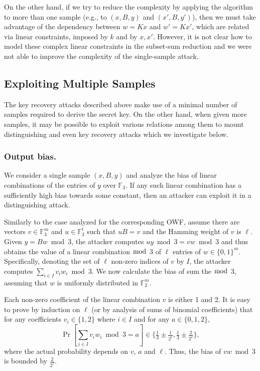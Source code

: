 \documentclass[orivec,envcountsect]{llncs}
\begin{document}
On the other hand, if we try to reduce the complexity by applying the algorithm to more than one sample (e.g., to $(x,B,y)$ and $(x',B,y')$), then we must take advantage of the dependency between $w = K x$ and $w' = K x'$, which are related via linear constraints, imposed by $k$ and by $x,x'$. However, it is not clear how to model these complex linear constraints in the subset-sum reduction and we were not able to improve the complexity of the single-sample attack.

\subsection{Exploiting Multiple Samples}
The key recovery attacks described above make use of a minimal number of samples required to derive the secret key. On the other hand, when given more samples, it may be possible to exploit various relations among them to mount distinguishing and even key recovery attacks which we investigate below.

\subsubsection{Output bias.}
We consider a single sample $(x,B,y)$ and analyze the bias of linear combinations of the entries of $y$ over $\mathbb{F}_3$.
If any such linear combination has a sufficiently high bias towards some constant,
then an attacker can exploit it in a distinguishing attack.

Similarly to the case analyzed for the corresponding OWF, assume there are vectors $v \in \mathbb{F}_3^m$ and $u \in \mathbb{F}_3^t$ such that $u B = v$ and the Hamming weight of $v$ is $\ell$. Given $y = Bw \bmod 3$, the attacker computes $uy \bmod 3 = vw \bmod 3$ and thus obtains the value of a linear combination $\bmod$ 3 of $\ell$ entries of $w \in \{0,1\}^m$.
Specifically, denoting the set of $\ell$ non-zero indices of $v$ by $I$, the attacker computes $\sum_{i \in I} v_i w_i \bmod 3$.
We now calculate the bias of sum the $\bmod $ 3, assuming that $w$ is uniformly distributed in $\mathbb{F}_2^m$.

Each non-zero coefficient of the linear combination $v$ is either 1 and 2.
It is easy to prove by induction on $\ell$ (or by analysis of sums of binomial coefficients) that
for any coefficients $v_i \in \{1,2\}$ where $i \in I$ and for any $a \in \{0,1,2\}$,
$$\Pr\left[\sum_{i \in I} v_i w_i \bmod 3 = a\right] \in \{\tfrac{1}{3} \pm \tfrac{1}{2^\ell}, \tfrac{1}{3} \pm \tfrac{2}{2^\ell}\},$$
where the actual probability depends on $v$, $a$ and $\ell$. Thus, the bias of $vw \bmod 3$ is bounded by $\tfrac{2}{2^\ell}$.
\end{document}
